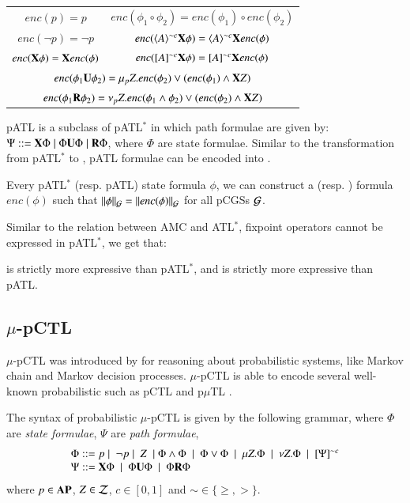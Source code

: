 \begin{center}
\begin{tabular}{cc}
 $enc(p)=p$ & $enc(\phi_1\circ \phi_2)=enc(\phi_1)\circ enc(\phi_2)$  \\
  $enc(\neg p)=\neg p$ & $enc(\langle{A}\rangle^{\sim c}{\bf X} \phi) = \langle{A}\rangle^{\sim c}{\bf X} enc(\phi)$   \\
 $enc({\bf X} \phi)={\bf X} enc(\phi)$ & $enc([{A}]^{\sim c}{\bf X} \phi) = [{A}]^{\sim c}{\bf X} enc(\phi)$  \\
   \multicolumn{2}{c}{$enc(\phi_1{\bf U}\phi_2)=\mu_p Z.enc(\phi_2)\vee (enc(\phi_1)\wedge {\bf X} Z)$}\\
   \multicolumn{2}{c}{$enc(\phi_1{\bf R}\phi_2)=\nu_p Z.enc(\phi_1\wedge \phi_2)\vee (enc(\phi_2)\wedge {\bf X} Z)$}\\
\end{tabular}
\end{center}


pATL is a subclass of pATL$^*$ in which path formulae are given by: $\Psi::={\bf X} \Phi \mid \Phi {\bf U} \Phi   \mid {\bf R}\Phi$, where
$\Phi$ are state formulae. Similar to the transformation from pATL$^*$ to \pamc,
pATL formulae can be encoded into \pamcc.


\begin{lemma}
Every pATL$^*$ (resp. pATL) state formula $\phi$,
we can construct a \pamc (resp. \pamcc) formula $enc(\phi)$ such that $\|{\phi}\|_{\mathcal{G}}=\|{enc(\phi)}\|_{\mathcal{G}}$ for all pCGSs $\mathcal{G}$.
\end{lemma}


Similar to the relation between AMC and ATL$^*$, fixpoint operators cannot be expressed in pATL$^*$, we get that:

\begin{theorem}
\pamc is strictly more expressive than pATL$^*$, and \pamcc is strictly more expressive than pATL.
\end{theorem}





\subsection{$\mu$-pCTL}
$\mu$-pCTL was introduced by \cite{CKP15} for reasoning about probabilistic systems, like Markov chain and Markov decision processes.
$\mu$-pCTL is able to encode several well-known probabilistic such as pCTL and p$\mu$TL \cite{LSWZ15}.


\begin{definition}[$\mu$-pCTL]
The syntax of probabilistic $\mu$-pCTL is given by the following grammar, where
$\Phi$ are \emph{state formulae}, $\Psi$ are \emph{path formulae},
 \[\begin{array}{l}
\Phi::=p\mid  \ \neg p \mid  \ Z \ \mid \Phi \wedge \Phi  \ \mid  \ \Phi \vee \Phi \ \mid \  \mu Z. \Phi  \ \mid \ \nu Z. \Phi  \  \mid \ [\Psi]^{\sim c} \\
\Psi::= \opX \Phi \ \mid \  \Phi \opU \Phi \ \mid  \ \Phi \opR \Phi \\
 \end{array}\]
where $p\in{\bf AP}$, $Z\in \mathcal{Z}$, $c\in[0,1]$ and $\sim\in\{\geq,>\}$.
\end{definition}

